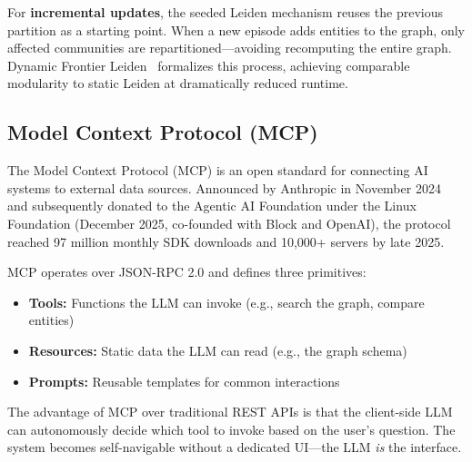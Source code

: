 For \textbf{incremental updates}, the seeded Leiden mechanism reuses the previous partition as a starting point. When a new episode adds entities to the graph, only affected communities are repartitioned---avoiding recomputing the entire graph. Dynamic Frontier Leiden~\cite{sahu2024dfleiden} formalizes this process, achieving comparable modularity to static Leiden at dramatically reduced runtime.

\subsection{Model Context Protocol (MCP)}

The Model Context Protocol (MCP) is an open standard for connecting AI systems to external data sources. Announced by Anthropic in November 2024 and subsequently donated to the Agentic AI Foundation under the Linux Foundation (December 2025, co-founded with Block and OpenAI), the protocol reached 97 million monthly SDK downloads and 10,000+ servers by late 2025.

MCP operates over JSON-RPC 2.0 and defines three primitives:

\begin{itemize}
    \item \textbf{Tools:} Functions the LLM can invoke (e.g., search the graph, compare entities)
    \item \textbf{Resources:} Static data the LLM can read (e.g., the graph schema)
    \item \textbf{Prompts:} Reusable templates for common interactions
\end{itemize}

The advantage of MCP over traditional REST APIs is that the client-side LLM can autonomously decide which tool to invoke based on the user's question. The system becomes self-navigable without a dedicated UI---the LLM \textit{is} the interface.
